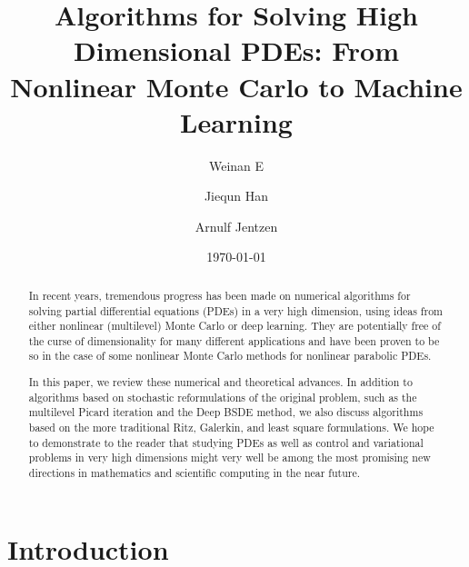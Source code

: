 \documentclass[12pt]{article}
\theoremstyle{definition}
\begin{document}
\title{Algorithms for Solving High Dimensional PDEs: 
From Nonlinear Monte Carlo to Machine Learning}
%
%

%
%

%

%
%

\author[1,2]{Weinan E}
\author[1]{Jiequn Han}
\author[3]{Arnulf Jentzen} 

\date{\normalsize \today}

%

%

%

%

%
   
%

%

\maketitle
\begin{abstract}
In recent years, tremendous progress has been made on numerical algorithms for solving partial differential equations (PDEs) in a very high dimension, using ideas from either nonlinear (multilevel) Monte Carlo or deep learning. They are potentially free of the curse of dimensionality for many different applications and have been proven to be so in the case of some nonlinear Monte Carlo methods for nonlinear parabolic PDEs.

In this paper, we review these numerical and theoretical advances. In addition to algorithms based on  stochastic reformulations of the original problem, such as the multilevel  Picard iteration and the Deep BSDE method,  we also discuss algorithms based on the more traditional Ritz, Galerkin, and least square formulations. We hope to demonstrate to the reader that studying PDEs as well as control and variational problems in very high dimensions might very well be among the most promising new directions in mathematics and scientific computing in the near future.
\end{abstract}

{
  \hypersetup{linkcolor=black}
  \tableofcontents
}

\section{Introduction}
\label{sec:intro}
\end{document}
